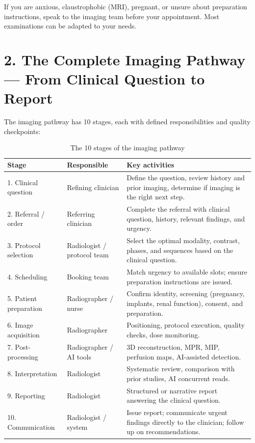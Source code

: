 \begin{pearlbox}
If you are anxious, claustrophobic (MRI), pregnant, or unsure about preparation instructions, speak to the imaging team before your appointment. Most examinations can be adapted to your needs.
\end{pearlbox}


\section*{2. The Complete Imaging Pathway --- From Clinical Question to Report}

The imaging pathway has 10 stages, each with defined responsibilities and quality checkpoints:

\begin{table}[h]
\centering
\caption{The 10 stages of the imaging pathway}
\begin{tabular}{|l|l|p{5cm}|}
\hline
\textbf{Stage} & \textbf{Responsible} & \textbf{Key activities} \\
\hline
1. Clinical question & Refining clinician & Define the question, review history and prior imaging, determine if imaging is the right next step. \\
\hline
2. Referral / order & Referring clinician & Complete the referral with clinical question, history, relevant findings, and urgency. \\
\hline
3. Protocol selection & Radiologist / protocol team & Select the optimal modality, contrast, phases, and sequences based on the clinical question. \\
\hline
4. Scheduling & Booking team & Match urgency to available slots; ensure preparation instructions are issued. \\
\hline
5. Patient preparation & Radiographer / nurse & Confirm identity, screening (pregnancy, implants, renal function), consent, and preparation. \\
\hline
6. Image acquisition & Radiographer & Positioning, protocol execution, quality checks, dose monitoring. \\
\hline
7. Post-processing & Radiographer / AI tools & 3D reconstruction, MPR, MIP, perfusion maps, AI-assisted detection. \\
\hline
8. Interpretation & Radiologist & Systematic review, comparison with prior studies, AI concurrent reads. \\
\hline
9. Reporting & Radiologist & Structured or narrative report answering the clinical question. \\
\hline
10. Communication & Radiologist / system & Issue report; communicate urgent findings directly to the clinician; follow up on recommendations. \\
\hline
\end{tabular}
\end{table}


